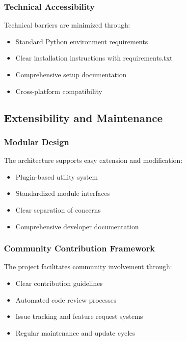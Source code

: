 \subsubsection{Technical Accessibility}

Technical barriers are minimized through:

\begin{itemize}
    \item Standard Python environment requirements
    \item Clear installation instructions with requirements.txt
    \item Comprehensive setup documentation
    \item Cross-platform compatibility
\end{itemize}

\subsection{Extensibility and Maintenance}

\subsubsection{Modular Design}

The architecture supports easy extension and modification:

\begin{itemize}
    \item Plugin-based utility system
    \item Standardized module interfaces
    \item Clear separation of concerns
    \item Comprehensive developer documentation
\end{itemize}

\subsubsection{Community Contribution Framework}

The project facilitates community involvement through:

\begin{itemize}
    \item Clear contribution guidelines
    \item Automated code review processes
    \item Issue tracking and feature request systems
    \item Regular maintenance and update cycles
\end{itemize}